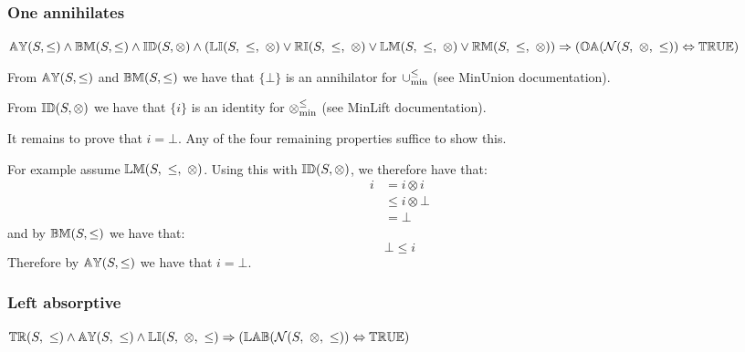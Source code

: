 \documentclass[../Summary.tex]{subfiles}
\begin{document}
\subsubsection{One annihilates}

$\propname{AY}(S,\leq) \wedge \propname{BM}(S,\leq) \wedge \propname{ID}(S,\otimes) \wedge (\propname{LI}(S,\ \leq,\ \otimes) \vee \propname{RI}(S,\ \leq,\ \otimes) \vee \propname{LM}(S,\ \leq,\ \otimes) \vee \propname{RM}(S,\ \leq,\ \otimes)) \Rightarrow (\propname{OA}(\mathcal{N}(S,\ \otimes,\ \leq)) \Leftrightarrow \propname{TRUE})$

\proof

From ${\mathbb{AY}}(S,\leq)$ and ${\mathbb{BM}}(S,\leq)$ we have that $\{ \bot \}$ is an annihilator for $\mathbin{\cup_{\min}^{\leq}}$ (see MinUnion documentation).

\vspace{0.5em}

From ${\mathbb{ID}}(S,\otimes)$ we have that $\{ i \}$ is an identity for $\mathbin{\otimes_{\min}^{\leq}}$ (see MinLift documentation).

\vspace{0.5em}

It remains to prove that $i = \bot$. Any of the four remaining properties suffice to show this. 

\vspace{0.5em}

For example assume $\propname{LM}(S,\ \leq,\ \otimes)$. Using this with ${\mathbb{ID}}(S,\otimes)$, we therefore have that:
\begin{align*}
i 	& = i \otimes i \\
  	& \leq i \otimes \bot \\
  	& = \bot
\end{align*} 
and by ${\mathbb{BM}}(S,\leq)$ we have that:
\begin{equation*}
\bot \leq i
\end{equation*}
Therefore by ${\mathbb{AY}}(S,\leq)$ we have that $i = \bot$.



\subsubsection{Left absorptive}

${\mathbb{TR}}(S,\ \leq) \wedge {\mathbb{AY}}(S,\ \leq) \wedge {\mathbb{LI}}(S,\ \otimes,\ \leq) \Rightarrow ({\mathbb{LAB}}(\mathcal{N}(S,\ \otimes,\ \leq)) \Leftrightarrow {\mathbb{TRUE}})$

\proof
\end{document}
